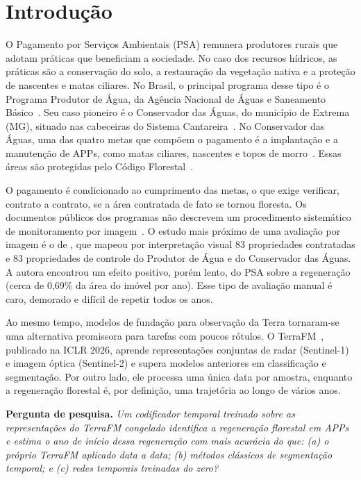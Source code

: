 \documentclass[conference]{IEEEtran}
\begin{document}
\section{Introdução}\label{sec:introducao}

O Pagamento por Serviços Ambientais (PSA) remunera produtores rurais que adotam práticas que beneficiam a sociedade. No caso dos recursos hídricos, as práticas são a conservação do solo, a restauração da vegetação nativa e a proteção de nascentes e matas ciliares. No Brasil, o principal programa desse tipo é o Programa Produtor de Água, da Agência Nacional de Águas e Saneamento Básico~\citep{ana2018}. Seu caso pioneiro é o Conservador das Águas, do município de Extrema (MG), situado nas cabeceiras do Sistema Cantareira~\citep{pcj_conservador,viani2019}. No Conservador das Águas, uma das quatro metas que compõem o pagamento é a implantação e a manutenção de APPs, como matas ciliares, nascentes e topos de morro~\citep{pcj_conservador}. Essas áreas são protegidas pelo Código Florestal~\citep{brasil2012}.

O pagamento é condicionado ao cumprimento das metas, o que exige verificar, contrato a contrato, se a área contratada de fato se tornou floresta. Os documentos públicos dos programas não descrevem um procedimento sistemático de monitoramento por imagem~\citep{ana2018,pcj_conservador}. O estudo mais próximo de uma avaliação por imagem é o de \citet{ruggiero2019}, que mapeou por interpretação visual 83 propriedades contratadas e 83 propriedades de controle do Produtor de Água e do Conservador das Águas. A autora encontrou um efeito positivo, porém lento, do PSA sobre a regeneração (cerca de 0,69\% da área do imóvel por ano). Esse tipo de avaliação manual é caro, demorado e difícil de repetir todos os anos.

Ao mesmo tempo, modelos de fundação para observação da Terra tornaram-se uma alternativa promissora para tarefas com poucos rótulos. O TerraFM~\citep{danish2026terrafm}, publicado na ICLR 2026, aprende representações conjuntas de radar (Sentinel-1) e imagem óptica (Sentinel-2) e supera modelos anteriores em classificação e segmentação. Por outro lado, ele processa uma única data por amostra, enquanto a regeneração florestal é, por definição, uma trajetória ao longo de vários anos.

\textbf{Pergunta de pesquisa.} \textit{Um codificador temporal treinado sobre as representações do TerraFM congelado identifica a regeneração florestal em APPs e estima o ano de início dessa regeneração com mais acurácia do que: (a) o próprio TerraFM aplicado data a data; (b) métodos clássicos de segmentação temporal; e (c) redes temporais treinadas do zero?}
\end{document}
